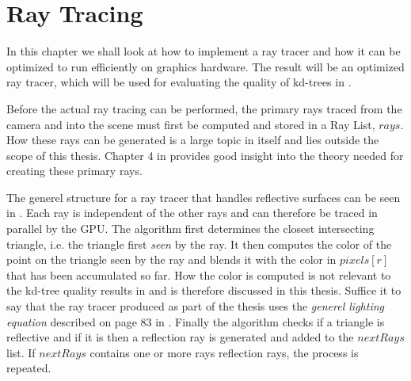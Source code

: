 


\chapter{Ray Tracing}\label{chp:rayTracing}






In this chapter we shall look at how to implement a ray tracer and how it can be
optimized to run efficiently on graphics hardware. The result will be an
optimized ray tracer, which will be used for evaluating the quality of kd-trees in
.

Before the actual ray tracing can be performed, the primary rays traced from the
camera and into the scene must first be computed and stored in a Ray List,
$rays$. How these rays can be generated is a large topic in itself and lies
outside the scope of this thesis. Chapter 4 in  provides good
insight into the theory needed for creating these primary rays.

The generel structure for a ray tracer that handles reflective surfaces can be
seen in . Each ray is independent of the other rays
and can therefore be traced in parallel by the GPU. The algorithm first
determines the closest intersecting triangle, i.e. the triangle first
\textit{seen} by the ray. It then computes the color of the point on the
triangle seen by the ray and blends it with the color in $pixels[r]$ that has
been accumulated so far. How the color is computed is not relevant to the
kd-tree quality results in  and is therefore discussed
in this thesis. Suffice it to say that the ray tracer produced as part of the
thesis uses the \textit{generel lighting equation} described on page 83 in
. Finally the algorithm checks if a triangle is reflective and if
it is then a reflection ray is generated and added to the $nextRays$ list. If
$nextRays$ contains one or more rays reflection rays, the process is repeated.

